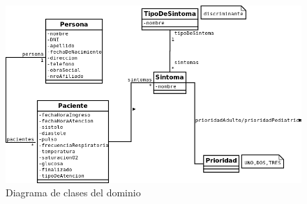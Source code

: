 \begin{figure}
\centerline{\includegraphics[width=1.2\textwidth]{triage.png}}
\caption{Diagrama de clases del dominio}
\label{fig:diagrama_de_clases}
\end{figure}